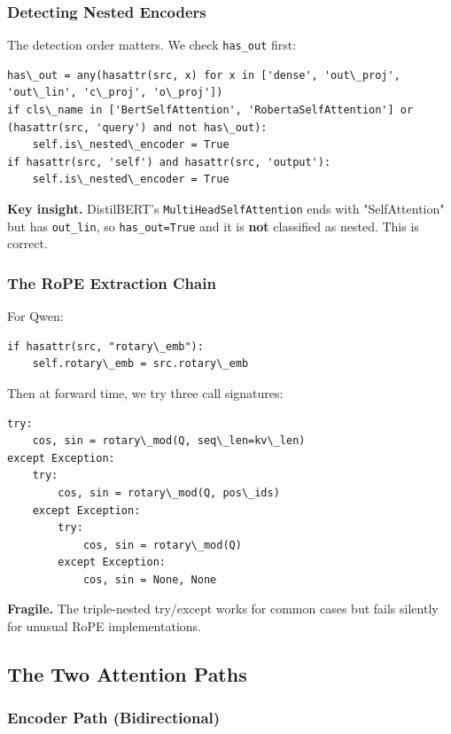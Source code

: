 \subsubsection{Detecting Nested Encoders}

The detection order matters. We check \texttt{has\_out} first:

\begin{lstlisting}
has\_out = any(hasattr(src, x) for x in ['dense', 'out\_proj', 'out\_lin', 'c\_proj', 'o\_proj'])
if cls\_name in ['BertSelfAttention', 'RobertaSelfAttention'] or (hasattr(src, 'query') and not has\_out):
    self.is\_nested\_encoder = True
if hasattr(src, 'self') and hasattr(src, 'output'):
    self.is\_nested\_encoder = True
\end{lstlisting}

\textbf{Key insight.} DistilBERT's \texttt{MultiHeadSelfAttention} ends with "SelfAttention" but has \texttt{out\_lin}, so \texttt{has\_out=True} and it is \textbf{not} classified as nested. This is correct.

\subsubsection{The RoPE Extraction Chain}

For Qwen:

\begin{lstlisting}
if hasattr(src, "rotary\_emb"):
    self.rotary\_emb = src.rotary\_emb
\end{lstlisting}

Then at forward time, we try three call signatures:

\begin{lstlisting}
try:
    cos, sin = rotary\_mod(Q, seq\_len=kv\_len)
except Exception:
    try:
        cos, sin = rotary\_mod(Q, pos\_ids)
    except Exception:
        try:
            cos, sin = rotary\_mod(Q)
        except Exception:
            cos, sin = None, None
\end{lstlisting}

\textbf{Fragile.} The triple-nested try/except works for common cases but fails 
silently for unusual RoPE implementations.

\subsection{The Two Attention Paths}

\subsubsection{Encoder Path (Bidirectional)}

